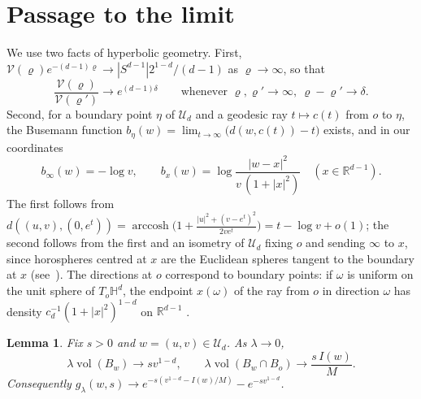 \documentclass[11pt]{amsart}
\newtheorem{lemma}[theorem]{Lemma}
\theoremstyle{remark}
\newcommand{\R}{\mathbb{R}}
\newcommand{\HH}{\mathbb{H}}
\newcommand{\vol}{\operatorname{vol}}
\begin{document}
\section{Passage to the limit}\label{sec:limit}

We use two facts of hyperbolic geometry. First, $\mathcal V(\varrho)e^{-(d-1)\varrho}\to|S^{d-1}|2^{1-d}/(d-1)$ as
$\varrho\to\infty$, so that
\begin{equation}\label{eq:ratio}
\frac{\mathcal V(\varrho)}{\mathcal V(\varrho')}\to e^{(d-1)\delta}\qquad\text{whenever }\varrho,\varrho'\to\infty,\
\varrho-\varrho'\to\delta .
\end{equation}
Second, for a boundary point $\eta$ of $\mathcal U_d$ and a geodesic ray $t\mapsto c(t)$ from $o$ to $\eta$, the
Busemann function $b_\eta(w)=\lim_{t\to\infty}\bigl(d(w,c(t))-t\bigr)$ exists, and in our coordinates
\begin{equation}\label{eq:busemann}
b_\infty(w)=-\log v,\qquad b_x(w)=\log\frac{|w-x|^2}{v\,(1+|x|^2)}\quad(x\in\R^{d-1}) .
\end{equation}
The first follows from $d((u,v),(0,e^t))=\operatorname{arccosh}\bigl(1+\frac{|u|^2+(v-e^t)^2}{2ve^t}\bigr)=t-\log
v+o(1)$; the second follows from the first and an isometry of $\mathcal U_d$ fixing $o$ and sending $\infty$ to $x$,
since horospheres centred at $x$ are the Euclidean spheres tangent to the boundary at $x$ (see~\cite[Section~4.6]{Rat}).
The directions at $o$ correspond to boundary points: if $\omega$ is uniform on the unit sphere of $T_o\HH^d$, the
endpoint $x(\omega)$ of the ray from $o$ in direction $\omega$ has density $c_d^{-1}(1+|x|^2)^{1-d}$ on $\R^{d-1}$
\cite[Lemma~3.1]{DCELU}.

\begin{lemma}\label{lem:limits}
Fix $s>0$ and $w=(u,v)\in\mathcal U_d$. As $\lambda\to0$,
\[
\lambda\vol(B_w)\to sv^{1-d},\qquad\lambda\vol(B_w\cap B_o)\to\frac{s\,I(w)}M .
\]
Consequently $g_\lambda(w,s)\to e^{-s(v^{1-d}-I(w)/M)}-e^{-sv^{1-d}}$.
\end{lemma}
\end{document}
